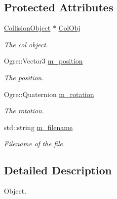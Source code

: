\subsection*{Protected Attributes}
\begin{DoxyCompactItemize}
\item 
\hypertarget{class_objects_1_1_i_object_a946df067938f5708a5fc92a6a3b7de3b}{\hyperlink{class_collision_object}{Collision\-Object} $\ast$ \hyperlink{class_objects_1_1_i_object_a946df067938f5708a5fc92a6a3b7de3b}{Col\-Obj}}\label{class_objects_1_1_i_object_a946df067938f5708a5fc92a6a3b7de3b}

\begin{DoxyCompactList}\small\item\em The col object. \end{DoxyCompactList}\item 
\hypertarget{class_objects_1_1_i_object_a7e8a3b317f3bd294609e7ea2e4915ea2}{Ogre\-::\-Vector3 \hyperlink{class_objects_1_1_i_object_a7e8a3b317f3bd294609e7ea2e4915ea2}{m\-\_\-position}}\label{class_objects_1_1_i_object_a7e8a3b317f3bd294609e7ea2e4915ea2}

\begin{DoxyCompactList}\small\item\em The position. \end{DoxyCompactList}\item 
\hypertarget{class_objects_1_1_i_object_ac3825691191c3b7d577c945c194a6e8a}{Ogre\-::\-Quaternion \hyperlink{class_objects_1_1_i_object_ac3825691191c3b7d577c945c194a6e8a}{m\-\_\-rotation}}\label{class_objects_1_1_i_object_ac3825691191c3b7d577c945c194a6e8a}

\begin{DoxyCompactList}\small\item\em The rotation. \end{DoxyCompactList}\item 
\hypertarget{class_objects_1_1_i_object_a98cc8033a8294ef833156cd3cc354657}{std\-::string \hyperlink{class_objects_1_1_i_object_a98cc8033a8294ef833156cd3cc354657}{m\-\_\-filename}}\label{class_objects_1_1_i_object_a98cc8033a8294ef833156cd3cc354657}

\begin{DoxyCompactList}\small\item\em Filename of the file. \end{DoxyCompactList}\end{DoxyCompactItemize}


\subsection{Detailed Description}
Object. 

